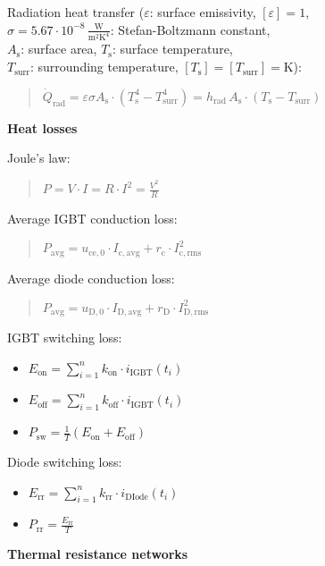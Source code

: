 \documentclass[fontsize=9pt,a4paper,twocolumn]{scrartcl}
\begin{document}
Radiation heat transfer ($\varepsilon$: surface emissivity, $[\varepsilon]=1$,\\ $\sigma=5.67\cdot 10^{-8}\,\frac{\mathrm{W}}{\mathrm{m}^2 \mathrm{K}^4}$: Stefan-Boltzmann constant,\\ $A_\mathrm{s}$: surface area, $T_\mathrm{s}$: surface temperature,\\ $T_\mathrm{surr}$: surrounding temperature, $[T_\mathrm{s}]=[T_\mathrm{surr}]=\mathrm{K}$):
\begin{quote}
	$\dot Q_\mathrm{rad}=\varepsilon\sigma A_\mathrm{s}\cdot\left(T_\mathrm{s}^4-T_\mathrm{surr}^4\right) = h_\mathrm{rad}\,A_\mathrm{s}\cdot\left(T_\mathrm{s}-T_\mathrm{surr}\right)$
\end{quote}

\large{\textbf{Heat losses}}

Joule's law:
\begin{quote}
	$P=V\cdot I=R\cdot I^2=\frac{V^2}{R}$
\end{quote}

Average IGBT conduction loss:
\begin{quote}
	$P_\mathrm{avg}=u_{\mathrm{ce},0}\cdot I_{\mathrm{c},\mathrm{avg}} + r_\mathrm{c}\cdot I_{\mathrm{c},\mathrm{rms}}^2$
\end{quote}

Average diode conduction loss:
\begin{quote}
	$P_\mathrm{avg}=u_{\mathrm{D},0}\cdot I_{\mathrm{D},\mathrm{avg}} + r_\mathrm{D}\cdot I_{\mathrm{D},\mathrm{rms}}^2$
\end{quote}

IGBT switching loss:
\begin{itemize}
	\item $E_\mathrm{on}=\sum_{i=1}^n k_\mathrm{on}\cdot i_\mathrm{IGBT}(t_i)$
	\item $E_\mathrm{off}=\sum_{i=1}^n k_\mathrm{off}\cdot i_\mathrm{IGBT}(t_i)$
	\item $P_\mathrm{sw}=\frac{1}{T}(E_\mathrm{on}+E_\mathrm{off})$
\end{itemize}

Diode switching loss:
\begin{itemize}
	\item $E_\mathrm{rr}=\sum_{i=1}^n k_\mathrm{rr}\cdot i_\mathrm{DIode}(t_i)$
	\item $P_\mathrm{rr}=\frac{E_\mathrm{rr}}{T}$
\end{itemize}

\large{\textbf{Thermal resistance networks}}
\end{document}
